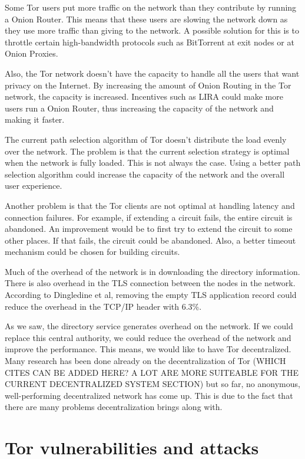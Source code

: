 \documentclass{article}
\begin{document}
		Some Tor users put more traffic on the network than they contribute by running a Onion Router. This means that these users are slowing the network down as they use more traffic than giving to the network. A possible solution for this is to throttle certain high-bandwidth protocols such as BitTorrent at exit nodes or at Onion Proxies.
		
		Also, the Tor network doesn't have the capacity to handle all the users that want privacy on the Internet. By increasing the amount of Onion Routing in the Tor network, the capacity is increased. Incentives such as LIRA \cite{jansen13lira} could make more users run a Onion Router, thus increasing the capacity of the network and making it faster.		
		
		The current path selection algorithm of Tor doesn't distribute the load evenly over the network. The problem is that the current selection strategy is optimal when the network is fully loaded. This is not always the case. Using a better path selection algorithm could increase the capacity of the network and the overall user experience.		
		
		Another problem is that the Tor clients are not optimal at handling latency and connection failures. For example, if extending a circuit fails, the entire circuit is abandoned. An improvement would be to first try to extend the circuit to some other places. If that fails, the circuit could be abandoned. Also, a better timeout mechanism could be chosen for building circuits.		
		
		Much of the overhead of the network is in downloading the directory information. There is also overhead in the TLS connection between the nodes in the network. According to Dingledine et al, removing the empty TLS application record could reduce the overhead in the TCP/IP header with 6.3\%.
		
		As we saw, the directory service generates overhead on the network. If we could replace this central authority, we could reduce the overhead of the network and improve the performance. This means, we would like to have Tor decentralized. Many research has been done already on the decentralization of Tor \cite{wang2012octopus, alsabah2013pctcp} (WHICH CITES CAN BE ADDED HERE? A LOT ARE MORE SUITEABLE FOR THE CURRENT DECENTRALIZED SYSTEM SECTION) but so far, no anonymous, well-performing decentralized network has come up. This is due to the fact that there are many problems decentralization brings along with.
		
\section{Tor vulnerabilities and attacks}
	\label{sec:attacks}
	
\end{document}
